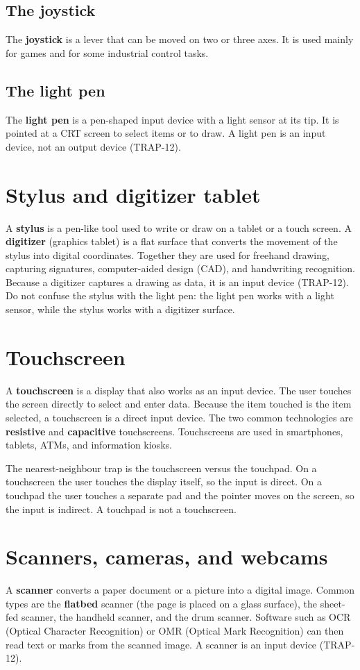 \subsection{The joystick}
The \textbf{joystick} is a lever that can be moved on two or three axes. It is
used mainly for games and for some industrial control tasks.

\subsection{The light pen}
The \textbf{light pen} is a pen-shaped input device with a light sensor at its
tip. It is pointed at a CRT screen to select items or to draw. A light pen is
an input device, not an output device (TRAP-12).

\section{Stylus and digitizer tablet}
A \textbf{stylus} is a pen-like tool used to write or draw on a tablet or a
touch screen. A \textbf{digitizer} (graphics tablet) is a flat surface that
converts the movement of the stylus into digital coordinates. Together they
are used for freehand drawing, capturing signatures, computer-aided design
(CAD), and handwriting recognition. Because a digitizer captures a drawing as
data, it is an input device (TRAP-12). Do not confuse the stylus with the
light pen: the light pen works with a light sensor, while the stylus works
with a digitizer surface.

\section{Touchscreen}
A \textbf{touchscreen} is a display that also works as an input device. The
user touches the screen directly to select and enter data. Because the item
touched is the item selected, a touchscreen is a direct input device. The two
common technologies are \textbf{resistive} and \textbf{capacitive}
touchscreens. Touchscreens are used in smartphones, tablets, ATMs, and
information kiosks.

The nearest-neighbour trap is the touchscreen versus the touchpad. On a
touchscreen the user touches the display itself, so the input is direct. On a
touchpad the user touches a separate pad and the pointer moves on the screen,
so the input is indirect. A touchpad is not a touchscreen.

\section{Scanners, cameras, and webcams}
A \textbf{scanner} converts a paper document or a picture into a digital
image. Common types are the \textbf{flatbed} scanner (the page is placed on a
glass surface), the sheet-fed scanner, the handheld scanner, and the drum
scanner. Software such as OCR (Optical Character Recognition) or OMR (Optical
Mark Recognition) can then read text or marks from the scanned image. A
scanner is an input device (TRAP-12).

